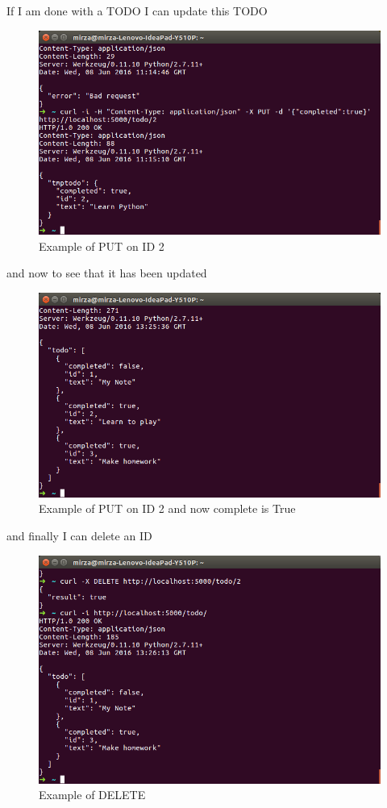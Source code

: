 \documentclass{sig-alternate-05-2015}
\begin{document}
If I am done with a TODO I can update this TODO
\begin{figure}[H]
  \centering
  \includegraphics[scale=0.35]{PUTID2.png}
  \caption{Example of PUT on ID 2}\label{PUTID2}
\end{figure}
and now to see that it has been updated
\begin{figure}[H]
  \centering
  \includegraphics[scale=0.35]{GETafterPutID2.png}
  \caption{Example of PUT on ID 2 and now complete is True}\label{GETafterPutID2}
\end{figure}
and finally I can delete an ID
\begin{figure}[H]
  \centering
  \includegraphics[scale=0.35]{DELETEID2.png}
  \caption{Example of DELETE}\label{DELETEID2}
\end{figure}
\end{document}
